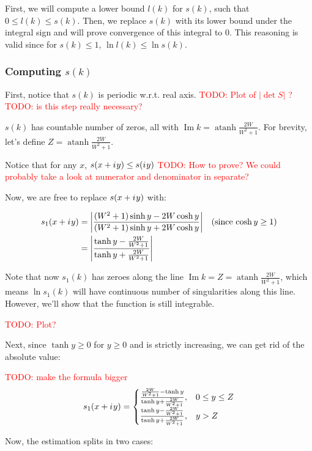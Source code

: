 \documentclass[12pt, a4paper]{article}
\newcommand{\abs}[1]{\left| #1 \right|}
\newcommand{\iu}{{i\mkern1mu}}
\renewcommand{\Im}{\operatorname{Im}}
\newcommand{\todo}[1]{{\large \textcolor{red}{TODO: #1}}}
\DeclareMathOperator\atanh{atanh}
\begin{document}
First, we will compute a lower bound $l(k)$ for $s(k)$, such that $0 \le l(k) \le s(k)$. Then, we replace $s(k)$ with its lower bound under the integral sign and will prove convergence of this integral to $0$. This reasoning is valid since for $s(k) \le 1$, $\ln l(k) \le \ln s(k)$.

\subsubsection{Computing $s(k)$}
First, notice that $s(k)$ is periodic w.r.t. real axis.
\todo{Plot of $\abs{\det S}$ ?}
\todo{is this step really necessary?}

$s(k)$ has countable number of zeros, all with $\Im k = \atanh \frac{2 W}{W^2 + 1}$. For brevity, let's define $Z = \atanh \frac{2 W}{W^2 + 1}$.

Notice that for any $x$, $s(x + \iu y) \le s(\iu y)$
\todo{How to prove? We could probably take a look at numerator and denominator in separate?}

Now, we are free to replace $s(x + \iu y)$ with:

\begin{align*}
s_1(x + \iu y)
 &= \abs{\frac{(W^2 + 1) \sinh y - 2 W \cosh y}{(W^2 + 1) \sinh y + 2 W \cosh y}} && \text{(since $\cosh y \ge 1$)}\\
 &= \abs{\frac{\tanh y - \frac{2 W}{W^2 + 1}}{\tanh y + \frac{2 W}{W^2 + 1}}}
\end{align*}

Note that now $s_1(k)$ has zeroes along the line $\Im k = Z = \atanh \frac{2 W}{W^2 + 1}$, which means $\ln s_1(k)$ will have continuous number of singularities along this line. However, we'll show that the function is still integrable.

\todo{Plot?}

Next, since $\tanh y \ge 0$ for $y \ge 0$ and is strictly increasing, we can get rid of the absolute value:

\todo{make the formula bigger}
\[
s_1(x + \iu y)
 = \begin{cases}
 \frac{\frac{2 W}{W^2 + 1} - \tanh y}{\tanh y + \frac{2 W}{W^2 + 1}}, & 0 \le y \le Z \\
 \frac{\tanh y - \frac{2 W}{W^2 + 1}}{\tanh y + \frac{2 W}{W^2 + 1}}, & y > Z 
 \end{cases}
\]

Now, the estimation splits in two cases:
\end{document}
